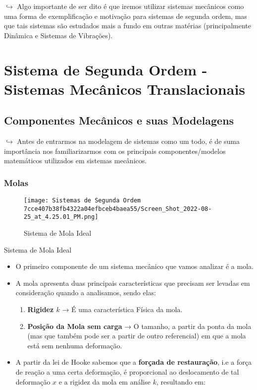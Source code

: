 \documentclass{article}
\begin{document}
\begin{itemize}
\(\hookrightarrow\) Algo importante de ser dito é que iremos utilizar
sistemas mecânicos como uma forma de exemplificação e motivação para
sistemas de segunda ordem, mas que tais sistemas são estudados mais a
fundo em outras matérias (principalmente Dinâmica e Sistemas de
Vibrações).

\hypertarget{sistema-de-segunda-ordem---sistemas-mecuxe2nicos-translacionais}{%
\section{Sistema de Segunda Ordem - Sistemas Mecânicos
Translacionais}\label{sistema-de-segunda-ordem---sistemas-mecuxe2nicos-translacionais}}

\hypertarget{componentes-mecuxe2nicos-e-suas-modelagens}{%
\subsection{Componentes Mecânicos e suas
Modelagens}\label{componentes-mecuxe2nicos-e-suas-modelagens}}

\(\hookrightarrow\) Antes de entrarmos na modelagem de sistemas como um
todo, é de suma importância nos familiarizarmos com os principais
componentes/modelos matemáticos utilizados em sistemas mecânicos.

\hypertarget{molas}{%
\subsubsection{Molas}\label{molas}}

\begin{figure}
\centering
\texttt{[image: Sistemas de Segunda Ordem 7cce407b38fb4322a04efbceb4baea55/Screen\_Shot\_2022-08-25\_at\_4.25.01\_PM.png]}
\caption{Sistema de Mola Ideal}
\end{figure}

Sistema de Mola Ideal

\begin{itemize}
\item
  O primeiro componente de um sistema mecânico que vamos analizar é a
  mola.
\item
  A mola apresenta duas principais características que precisam ser
  levadas em consideração quando a analisamos, sendo elas:

  \begin{enumerate}
  \def\labelenumi{\arabic{enumi}.}
  \tightlist
  \item
    \textbf{Rigidez \(k\)} → É uma característica Física da mola.
  \item
    \textbf{Posição da Mola sem carga} → O tamanho, a partir da ponta da
    mola (mas que também pode ser a partir de outro referencial) em que
    a mola está sem nenhuma deformação.
  \end{enumerate}
\item
  A partir da lei de Hooke sabemos que a \textbf{forçada de
  restauração}, i.e a força de reação a uma certa deformação, é
  proporcional ao deslocamento de tal deformação \(x\) e a rigidez da
  mola em análise \(k\), resultando em:


\end{itemize}
\end{itemize}
\end{document}
